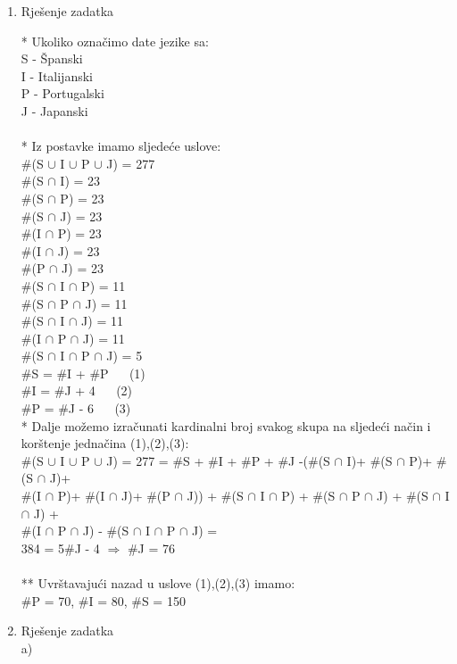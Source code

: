 \documentclass[12pt]{article}
\begin{document}
    
	\begin{enumerate}
		\item Rješenje zadatka
		
		* Ukoliko označimo date jezike sa: \\
		S - Španski \\
		I - Italijanski \\
		P - Portugalski \\
		J - Japanski \\
		\\
		* Iz postavke imamo sljedeće uslove: \\
		\#(S {$\cup$} I {$\cup$} P {$\cup$} J) = 277 \\
		\#(S {$\cap$} I) = 23  \\
		\#(S {$\cap$} P) = 23  \\
		\#(S {$\cap$} J) = 23  \\
		\#(I {$\cap$} P) = 23  \\
	    \#(I {$\cap$} J) = 23  \\ 
		\#(P {$\cap$} J) = 23  \\
		\#(S {$\cap$} I {$\cap$} P) = 11 \\
		\#(S {$\cap$} P {$\cap$} J) = 11 \\
		\#(S {$\cap$} I {$\cap$} J) = 11 \\
		\#(I {$\cap$} P {$\cap$} J) = 11 \\
		\#(S {$\cap$} I {$\cap$} P {$\cap$} J) = 5 \\
		\#S = \#I + \#P ~~ (1)\\
		\#I = \#J + 4 ~~ (2)\\
		\#P = \#J - 6 ~~ (3)\\
		
		* Dalje možemo izračunati kardinalni broj svakog skupa na sljedeći način i \\ korštenje jednačina (1),(2),(3): \\
		
		\#(S {$\cup$} I {$\cup$} P {$\cup$} J) = 277 = \#S + \#I + \#P + \#J -(\#(S {$\cap$} I)+ \#(S {$\cap$} P)+ \#(S {$\cap$} J)+ \\\#(I {$\cap$} P)+ \#(I {$\cap$} J)+ \#(P {$\cap$} J)) + \#(S {$\cap$} I {$\cap$} P) + \#(S {$\cap$} P {$\cap$} J) + \#(S {$\cap$} I {$\cap$} J) + \\\#(I {$\cap$} P {$\cap$} J) - \#(S {$\cap$} I {$\cap$} P {$\cap$} J)  = \\
		384 = 5\#J - 4 {$\Rightarrow$} \#J = 76 \\
		\\
		** Uvrštavajući nazad u uslove (1),(2),(3) imamo: \\
		\#P = 70, \#I = 80, \#S = 150 \\
		\item Rješenje zadatka
		\\
		a) 
		\begin{equation*}
		

\end{equation*}
\end{enumerate}
\end{document}
